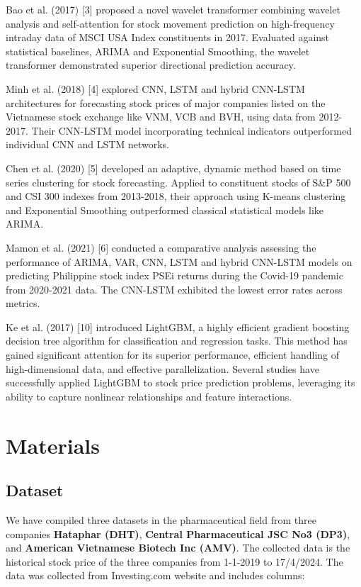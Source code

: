 \documentclass{ieeeojies}
\begin{document}
Bao et al. (2017) [3] proposed a novel wavelet transformer combining wavelet analysis and self-attention for stock movement prediction on high-frequency intraday data of MSCI USA Index constituents in 2017. Evaluated against statistical baselines, ARIMA and Exponential Smoothing, the wavelet transformer demonstrated superior directional prediction accuracy.

Minh et al. (2018) [4] explored CNN, LSTM and hybrid CNN-LSTM architectures for forecasting stock prices of major companies listed on the Vietnamese stock exchange like VNM, VCB and BVH, using data from 2012-2017. Their CNN-LSTM model incorporating technical indicators outperformed individual CNN and LSTM networks.

Chen et al. (2020) [5] developed an adaptive, dynamic method based on time series clustering for stock forecasting. Applied to constituent stocks of S\&P 500 and CSI 300 indexes from 2013-2018, their approach using K-means clustering and Exponential Smoothing outperformed classical statistical models like ARIMA.

Mamon et al. (2021) [6] conducted a comparative analysis assessing the performance of ARIMA, VAR, CNN, LSTM and hybrid CNN-LSTM models on predicting Philippine stock index PSEi returns during the Covid-19 pandemic from 2020-2021 data. The CNN-LSTM exhibited the lowest error rates across metrics.

Ke et al. (2017) [10] introduced LightGBM, a highly efficient gradient boosting decision tree algorithm for classification and regression tasks. This method has gained significant attention for its superior performance, efficient handling of high-dimensional data, and effective parallelization. Several studies have successfully applied LightGBM to stock price prediction problems, leveraging its ability to capture nonlinear relationships and feature interactions. 
 \\
\section{Materials}
\subsection{Dataset}


We have compiled three datasets in the pharmaceutical field from three companies  \textbf{Hataphar (DHT)}, \textbf{Central Pharmaceutical JSC No3 (DP3)}, and \textbf{American
Vietnamese Biotech Inc (AMV)}. The collected data is the historical stock price of the three companies from 1-1-2019 to 17/4/2024. The data was collected from Investing.com website and includes columns:
\end{document}
